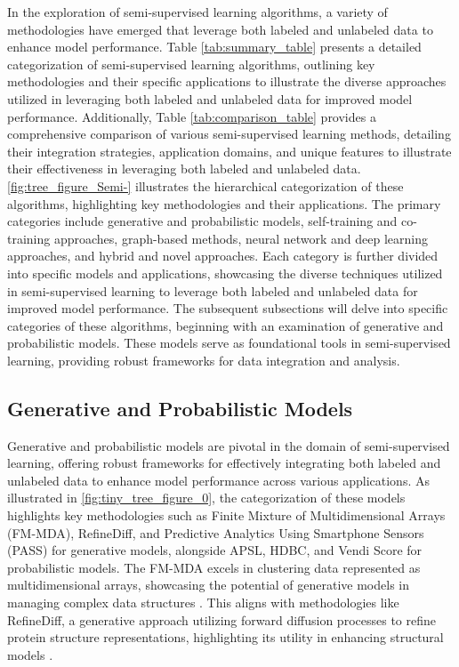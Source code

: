 

In the exploration of semi-supervised learning algorithms, a variety of methodologies have emerged that leverage both labeled and unlabeled data to enhance model performance. Table \ref{tab:summary_table} presents a detailed categorization of semi-supervised learning algorithms, outlining key methodologies and their specific applications to illustrate the diverse approaches utilized in leveraging both labeled and unlabeled data for improved model performance. Additionally, Table \ref{tab:comparison_table} provides a comprehensive comparison of various semi-supervised learning methods, detailing their integration strategies, application domains, and unique features to illustrate their effectiveness in leveraging both labeled and unlabeled data. \autoref{fig:tree_figure_Semi-} illustrates the hierarchical categorization of these algorithms, highlighting key methodologies and their applications. The primary categories include generative and probabilistic models, self-training and co-training approaches, graph-based methods, neural network and deep learning approaches, and hybrid and novel approaches. Each category is further divided into specific models and applications, showcasing the diverse techniques utilized in semi-supervised learning to leverage both labeled and unlabeled data for improved model performance. The subsequent subsections will delve into specific categories of these algorithms, beginning with an examination of generative and probabilistic models. These models serve as foundational tools in semi-supervised learning, providing robust frameworks for data integration and analysis.


 






\subsection{Generative and Probabilistic Models} \label{subsec:Generative and Probabilistic Models}

Generative and probabilistic models are pivotal in the domain of semi-supervised learning, offering robust frameworks for effectively integrating both labeled and unlabeled data to enhance model performance across various applications. As illustrated in \autoref{fig:tiny_tree_figure_0}, the categorization of these models highlights key methodologies such as Finite Mixture of Multidimensional Arrays (FM-MDA), RefineDiff, and Predictive Analytics Using Smartphone Sensors (PASS) for generative models, alongside APSL, HDBC, and Vendi Score for probabilistic models. The FM-MDA excels in clustering data represented as multidimensional arrays, showcasing the potential of generative models in managing complex data structures \cite{tait2020clusteringhigherorderdata}. This aligns with methodologies like RefineDiff, a generative approach utilizing forward diffusion processes to refine protein structure representations, highlighting its utility in enhancing structural models \cite{huang2023dataefficientprotein3dgeometric}.

